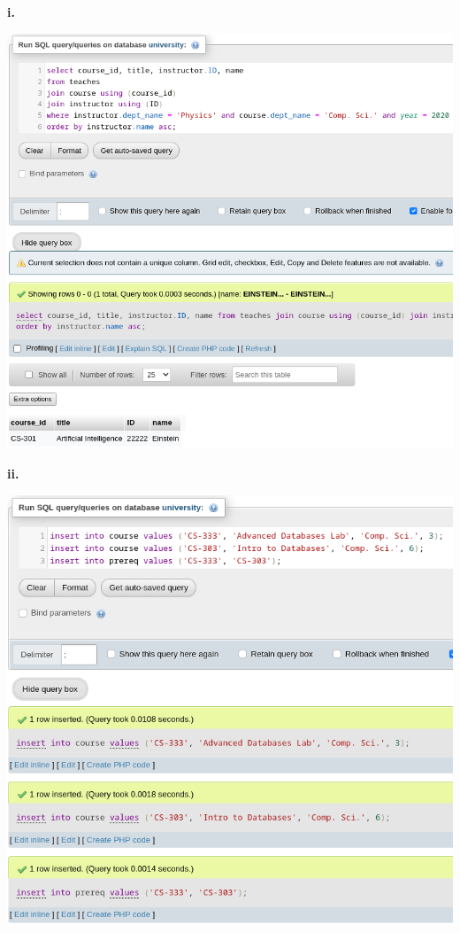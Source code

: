 \documentclass{article}
\begin{document}
\section{}
\textbf{i.}
    \begin{center}
    \includegraphics[scale=0.6]{8i.png}
\end{center}
\newpage
\textbf{ii.}
    \begin{center}
    \includegraphics[scale=0.6]{8ii.png}
\end{center}
\end{document}
